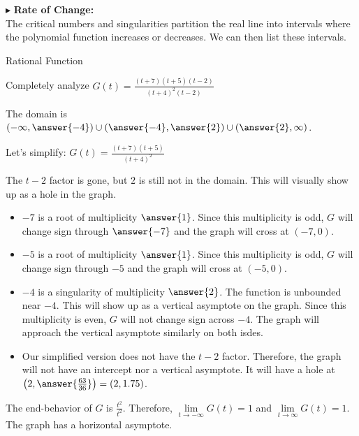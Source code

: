 \documentclass{ximera}
\begin{document}
$\blacktriangleright$ \textbf{\textcolor{red!10!blue!90!}{Rate of Change:}} \\
The critical numbers and singularities partition the real line into intervals where the polynomial function increases or decreases.  We can then list these intervals.















\begin{example} Rational Function


Completely analyze $G(t) = \frac{(t+7)(t+5)(t-2)}{(t+4)^2(t-2)}$


The domain is $\left( -\infty, \answer{-4} \right) \cup \left(\answer{-4}, \answer{2} \right) \cup \left( \answer{2}, \infty \right)$.

Let's simplify: $G(t) = \frac{(t+7)(t+5)}{(t+4)^2}$



The $t-2$ factor is gone, but $2$ is still not in the domain.  This will visually show up as a hole in the graph.



\begin{itemize}
\item $-7$ is a root of multiplicity $\answer{1}$.  Since this multiplicity is odd, $G$ will change sign through $\answer{-7}$ and the graph will cross at $(-7,0)$.
\item $-5$ is a root of multiplicity $\answer{1}$.  Since this multiplicity is odd, $G$ will change sign through $-5$ and the graph will cross at $(-5,0)$.
\item $-4$ is a singularity of multiplicity $\answer{2}$.  The function is unbounded near $-4$.  This will show up as a vertical asymptote on the graph. Since this multiplicity is even, $G$ will not change sign across $-4$.  The graph will approach the vertical asymptote similarly on both isdes.
\item Our simplified version does not have the $t-2$ factor.  Therefore, the graph will not have an intercept nor a vertical asymptote.  It will have a hole at $\left( 2, \answer{\frac{63}{36}} \right) = (2, 1.75)$.
\end{itemize}


The end-behavior of $G$ is $\frac{t^2}{t^2}$.  Therefore, $\lim\limits_{t \to -\infty}G(t) = 1$ and $\lim\limits_{t \to \infty}G(t) = 1$.  The graph has a horizontal asymptote.





\end{example}
\end{document}

